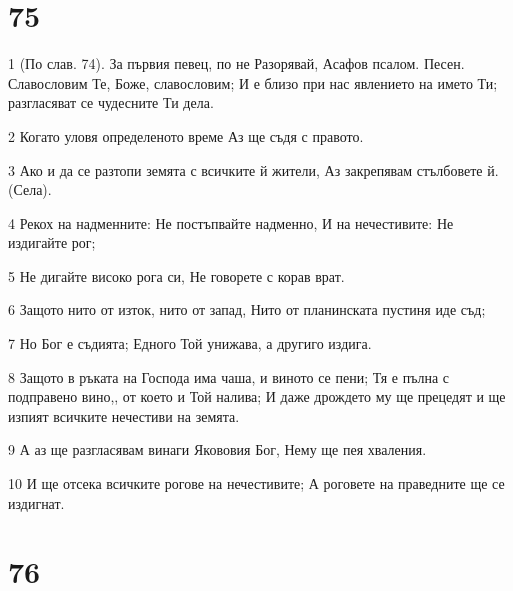 \chapter{75}

\par 1 (По слав. 74). За първия певец, по не Разорявай, Асафов псалом. Песен. Славословим Те, Боже, славословим; И е близо при нас явлението на името Ти; разгласяват се чудесните Ти дела.
\par 2 Когато уловя определеното време Аз ще съдя с правото.
\par 3 Ако и да се разтопи земята с всичките й жители, Аз закрепявам стълбовете й. (Села).
\par 4 Рекох на надменните: Не постъпвайте надменно, И на нечестивите: Не издигайте рог;
\par 5 Не дигайте високо рога си, Не говорете с корав врат.
\par 6 Защото нито от изток, нито от запад, Нито от планинската пустиня иде съд;
\par 7 Но Бог е съдията; Едного Той унижава, а другиго издига.
\par 8 Защото в ръката на Господа има чаша, и виното се пени; Тя е пълна с подправено вино,, от което и Той налива; И даже дрождето му ще прецедят и ще изпият всичките нечестиви на земята.
\par 9 А аз ще разгласявам винаги Якововия Бог, Нему ще пея хваления.
\par 10 И ще отсека всичките рогове на нечестивите; А роговете на праведните ще се издигнат.

\chapter{76}

